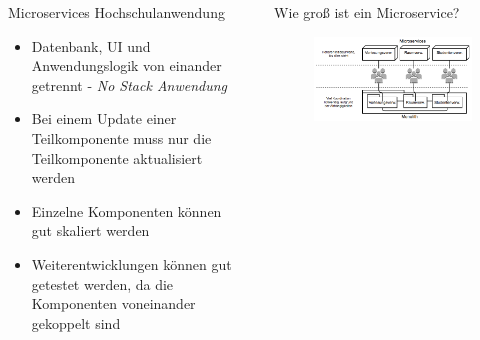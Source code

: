 \documentclass[final]{beamer}
\newlength{\sepwid}
\newlength{\onecolwid}
\newlength{\twocolwid}
\begin{document}
\begin{frame}
\begin{columns}[t]
\begin{column}{\onecolwid}
\begin{block}{Microservices Hochschulanwendung}
\begin{itemize}
	\item Datenbank, UI und Anwendungslogik von
einander getrennt - \textit{No Stack Anwendung}
	\item Bei einem Update einer Teilkomponente muss nur die Teilkomponente aktualisiert werden
	\item Einzelne Komponenten können gut skaliert werden
	\item Weiterentwicklungen können gut getestet werden, da die Komponenten voneinander gekoppelt sind
	\end{itemize}
\end{block}

\end{column} %

\begin{column}{\sepwid}\end{column} %

\begin{column}{\twocolwid} %

\begin{columns}[t,totalwidth=\twocolwid] %

\begin{column}{\onecolwid}\vspace{-.74in} %


\begin{block}{Wie groß ist ein Microservice?}

\begin{figure}
	\includegraphics{teamwork}
\end{figure}


\end{block}
\end{column}
\end{columns}
\end{column}
\end{columns}
\end{frame}
\end{document}

